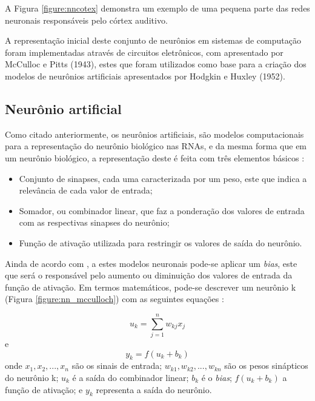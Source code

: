 A Figura \ref{figure:nncotex} demonstra um exemplo de uma pequena parte das redes neuronais responsáveis pelo córtex auditivo.



A representação inicial deste conjunto de neurônios em sistemas de computação foram implementadas através de circuitos eletrônicos, com apresentado por McCulloc e Pitts (1943), estes que foram utilizados como base para a criação dos modelos de neurônios artificiais apresentados por Hodgkin e Huxley (1952).

\subsection{Neurônio artificial}

Como citado anteriormente, os neurônios artificiais, são modelos computacionais para a representação do neurônio biológico nas RNAs, e da mesma forma que em um neurônio biológico, a representação deste é feita com três elementos básicos \cite{Haykin2001}:  

\begin{itemize}
	\item Conjunto de sinapses, cada uma caracterizada por um peso, este que indica a relevância de cada valor de entrada;
	\item Somador, ou combinador linear, que faz a ponderação dos valores de entrada com as respectivas sinapses do neurônio;
	\item Função de ativação utilizada para restringir os valores de saída do neurônio.
\end{itemize}

Ainda de acordo com , a estes modelos neuronais pode-se aplicar um \textit{bias}, este que será o responsável pelo aumento ou diminuição dos valores de entrada da função de ativação. Em termos matemáticos, pode-se descrever um neurônio k (Figura \ref{figure:nn_mcculloch}) com as seguintes equações \cite{Haykin2001}:

\begin{equation}
	u_{k} = \sum_{j=1}^{n} w_{kj} x_{j}
\end{equation}
e
\begin{equation}
	y_{k} = f(u_{k} + b_{k})	
\end{equation}
onde $ x_{1}, x_{2}, ..., x_{n} $ são os sinais de entrada; $ w_{k1}, w_{k2}, ..., w_{kn} $ são os pesos sinápticos do neurônio k; $ u_{k} $ é a saída do combinador linear; $ b_{k} $ é o \textit{bias}; $ f(u_{k} + b_{k}) $ a função de ativação; e $ y_{k} $ representa a saída do neurônio.


